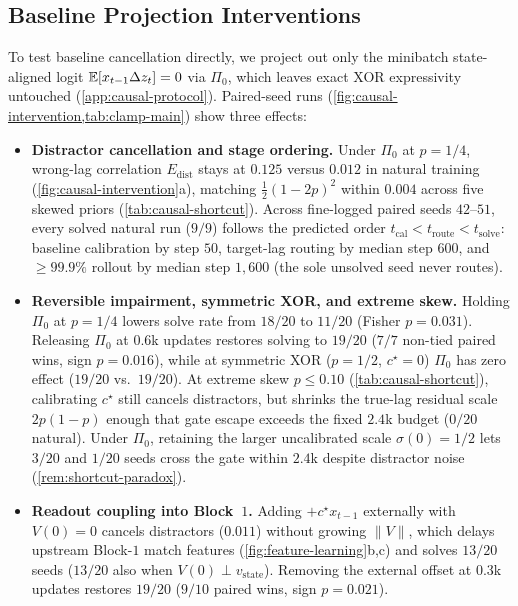 \subsection{Baseline Projection Interventions}
\label{sec:causal-shortcut}

To test baseline cancellation directly, we project out only the minibatch state-aligned logit $\mathbb E[x_{t-1}\Delta z_t] = 0$ via $\Pi_0$, which leaves exact XOR expressivity untouched (\cref{app:causal-protocol}). Paired-seed runs (\cref{fig:causal-intervention,tab:clamp-main}) show three effects:
\begin{itemize}[leftmargin=*,itemsep=1.2pt,topsep=1.5pt]
\item \textbf{Distractor cancellation and stage ordering.} Under $\Pi_0$ at $p = 1/4$, wrong-lag correlation $E_{\mathrm{dist}}$ stays at $0.125$ versus $0.012$ in natural training (\cref{fig:causal-intervention}a), matching $\frac{1}{2}(1-2p)^2$ within $0.004$ across five skewed priors (\cref{tab:causal-shortcut}). Across fine-logged paired seeds $42$--$51$, every solved natural run ($9/9$) follows the predicted order $t_{\mathrm{cal}} < t_{\mathrm{route}} < t_{\mathrm{solve}}$: baseline calibration by step $50$, target-lag routing by median step $600$, and $\ge 99.9\%$ rollout by median step $1{,}600$ (the sole unsolved seed never routes).
\item \textbf{Reversible impairment, symmetric XOR, and extreme skew.} Holding $\Pi_0$ at $p = 1/4$ lowers solve rate from $18/20$ to $11/20$ (Fisher $p = 0.031$). Releasing $\Pi_0$ at $0.6$k updates restores solving to $19/20$ ($7/7$ non-tied paired wins, sign $p = 0.016$), while at symmetric XOR ($p = 1/2$, $c^\star = 0$) $\Pi_0$ has zero effect ($19/20$ vs.\ $19/20$). At extreme skew $p \le 0.10$ (\cref{tab:causal-shortcut}), calibrating $c^\star$ still cancels distractors, but shrinks the true-lag residual scale $2p(1-p)$ enough that gate escape exceeds the fixed $2.4$k budget ($0/20$ natural). Under $\Pi_0$, retaining the larger uncalibrated scale $\sigma(0) = 1/2$ lets $3/20$ and $1/20$ seeds cross the gate within $2.4$k despite distractor noise (\cref{rem:shortcut-paradox}).
\item \textbf{Readout coupling into Block~$1$.} Adding $+c^\star x_{t-1}$ externally with $V(0) = 0$ cancels distractors ($0.011$) without growing $\|V\|$, which delays upstream Block-$1$ match features (\cref{fig:feature-learning}b,c) and solves $13/20$ seeds ($13/20$ also when $V(0) \perp v_{\mathrm{state}}$). Removing the external offset at $0.3$k updates restores $19/20$ ($9/10$ paired wins, sign $p = 0.021$).
\end{itemize}

